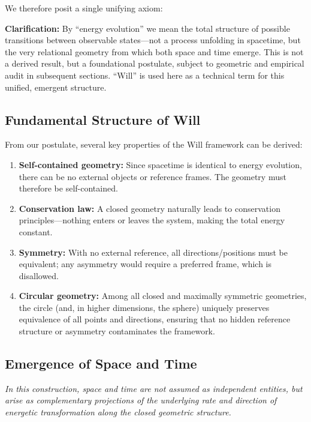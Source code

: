 \documentclass{article}
\begin{document}
\vspace{1em}
We therefore posit a single unifying axiom:

\begin{center}
\end{center}

\textbf{Clarification:} By ``energy evolution'' we mean the total structure of possible transitions between observable states---not a process unfolding in spacetime, but the very relational geometry from which both space and time emerge. This is not a derived result, but a foundational postulate, subject to geometric and empirical audit in subsequent sections. ``Will'' is used here as a technical term for this unified, emergent structure.


\subsection{Fundamental Structure of Will}

From our postulate, several key properties of the Will framework can be derived:

\begin{enumerate}
    \item \textbf{Self-contained geometry:} Since spacetime is identical to energy evolution, there can be no external objects or reference frames. The geometry must therefore be self-contained.
    
    \item \textbf{Conservation law:} A closed geometry naturally leads to conservation principles—nothing enters or leaves the system, making the total energy constant.
    
    \item \textbf{Symmetry:} With no external reference, all directions/positions must be equivalent; any asymmetry would require a preferred frame, which is disallowed. 
    
    \item \textbf{Circular geometry:} Among all closed and maximally symmetric geometries, the circle (and, in higher dimensions, the sphere) uniquely preserves equivalence of all points and directions, ensuring that no hidden reference structure or asymmetry contaminates the framework.
\end{enumerate}

\subsection{Emergence of Space and Time}
\textit{In this construction, space and time are not assumed as independent entities, but arise as complementary projections of the underlying rate and direction of energetic transformation along the closed geometric structure.}
\end{document}
